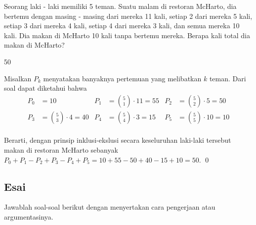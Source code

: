 \documentclass[12pt]{scrartcl}
\begin{document}
	\vspace{10pt}
	\begin{soalbaru}
		Seorang laki - laki memiliki 5 teman. Suatu malam di restoran McHarto, dia bertemu
		dengan masing - masing dari mereka 11 kali, setiap 2 dari mereka 5 kali, setiap 3 dari mereka 4 kali, setiap 4 dari mereka 3 kali, dan semua mereka 10 kali. Dia makan di McHarto 10 kali tanpa bertemu mereka. Berapa kali total dia makan di McHarto?
		\begin{jawaban}
			50
		\end{jawaban}
		\begin{solusi}
		Misalkan $P_k$ menyatakan banyaknya pertemuan yang melibatkan $k$ teman. Dari soal dapat diketahui bahwa \\[-25pt]
		\begin{align*}
		P_0 &= 10 & P_1 &= {5 \choose 1}\cdot 11=55 & P_2 &= {5 \choose 2}\cdot 5=50\\
		P_3 &= {5 \choose 3}\cdot 4=40 & P_4 &= {5 \choose 4}\cdot 3=15 & P_5 &= {5 \choose 5}\cdot 10 = 10
		\end{align*}\\[-20pt]
		Berarti, dengan prinsip inklusi-ekslusi secara keseluruhan laki-laki tersebut makan di restoran McHarto sebanyak $P_0+P_1-P_2+P_3-P_4+P_5 = 10 + 55 - 50 + 40 - 15 + 10=50.$ \qed
		\end{solusi}
		
		
	\end{soalbaru}
\newpage
\subsection{Esai}
Jawablah soal-soal berikut dengan menyertakan cara pengerjaan atau argumentasinya.
	
\end{document}
